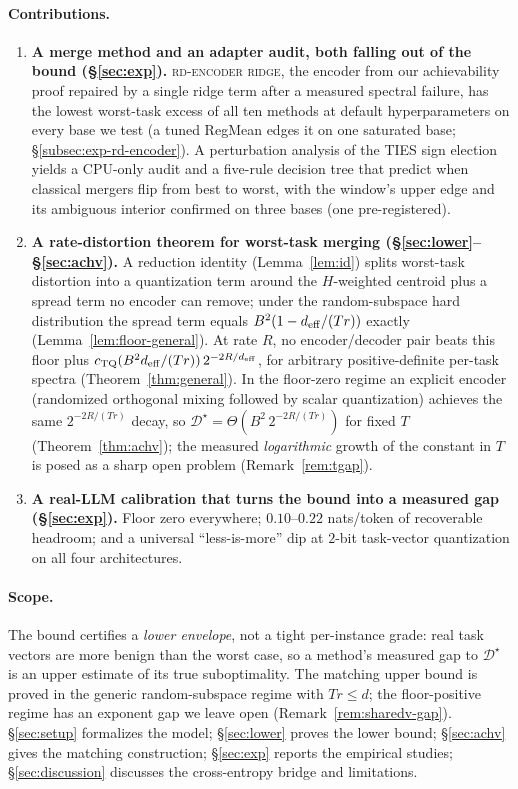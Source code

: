 \paragraph{Contributions.}
\begin{enumerate}[leftmargin=*,topsep=2pt,itemsep=2pt]
\item \textbf{A merge method and an adapter audit, both falling out of
the bound (\S\ref{sec:exp}).} \textsc{rd-encoder ridge}, the encoder
from our achievability proof repaired by a single ridge term after a
measured spectral failure, has the lowest worst-task excess of all
ten methods at default hyperparameters on every base we test (a tuned
RegMean edges it on one saturated base;
\S\ref{subsec:exp-rd-encoder}). A
perturbation analysis of the TIES sign election yields a CPU-only audit
and a five-rule decision tree that predict when classical mergers flip
from best to worst, with the window's upper edge and its ambiguous
interior confirmed on three bases (one pre-registered).

\item \textbf{A rate-distortion theorem for worst-task merging
(\S\ref{sec:lower}--\S\ref{sec:achv}).} A reduction identity
(Lemma~\ref{lem:id}) splits worst-task distortion into a quantization
term around the $H$-weighted centroid plus a spread term no encoder
can remove; under the random-subspace hard distribution the spread
term equals $B^2(1 - d_{\mathrm{eff}}/(Tr))$ exactly
(Lemma~\ref{lem:floor-general}). At rate $R$, no encoder/decoder pair
beats this floor plus
$c_{\mathrm{TQ}} (B^2 d_{\mathrm{eff}}/(Tr))\, 2^{-2R/d_{\mathrm{eff}}}$, for arbitrary
positive-definite per-task spectra (Theorem~\ref{thm:general}). In
the floor-zero regime an explicit encoder (randomized orthogonal
mixing followed by scalar quantization) achieves the same
$2^{-2R/(Tr)}$ decay, so
$\mathcal{D}^\star = \Theta(B^2\, 2^{-2R/(Tr)})$ for fixed $T$
(Theorem~\ref{thm:achv}); the measured \emph{logarithmic} growth of
the constant in $T$ is posed as a sharp open problem
(Remark~\ref{rem:tgap}).

\item \textbf{A real-LLM calibration that turns the bound into a
measured gap (\S\ref{sec:exp}).} Floor zero everywhere;
$0.10$--$0.22$ nats/token of recoverable headroom; and a universal
``less-is-more'' dip at $2$-bit task-vector quantization on all four
architectures.
\end{enumerate}

\paragraph{Scope.} The bound certifies a \emph{lower envelope}, not a
tight per-instance grade: real task vectors are more benign than the
worst case, so a method's measured gap to $\mathcal{D}^\star$ is an
upper estimate of its true suboptimality. The matching upper bound is proved in the generic
random-subspace regime with $Tr \leq d$; the floor-positive regime has
an exponent gap we leave open (Remark~\ref{rem:sharedv-gap}).
\S\ref{sec:setup} formalizes the model; \S\ref{sec:lower} proves the
lower bound; \S\ref{sec:achv} gives the matching construction;
\S\ref{sec:exp} reports the empirical studies; \S\ref{sec:discussion}
discusses the cross-entropy bridge and limitations.
